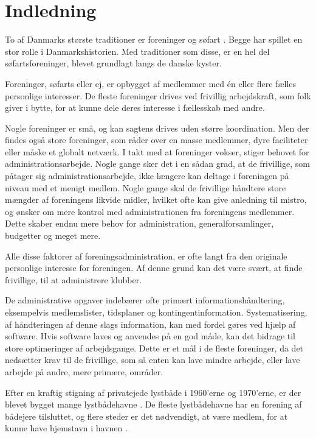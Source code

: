 \chapter{Indledning}
To af Danmarks største traditioner er foreninger og søfart \cite{forening2010,moller1997}. Begge har spillet en stor rolle i Danmarkshistorien. Med traditioner som disse, er en hel del søfartsforeninger, blevet grundlagt langs de danske kyster. 

Foreninger, søfarts eller ej, er opbygget af medlemmer med én eller flere fælles personlige interesser. De fleste foreninger drives ved frivillig arbejdskraft, som folk giver i bytte, for at kunne dele deres interesse i fællesskab med andre. 

Nogle foreninger er små, og kan sagtens drives uden større koordination. Men der findes også store foreninger, som råder over en masse medlemmer, dyre faciliteter eller måske et globalt netværk. I takt med at foreninger vokser, stiger behovet for administrationsarbejde. Nogle gange sker det i en sådan grad, at de frivillige, som påtager sig administrationsarbejde, ikke længere kan deltage i foreningen på niveau med et menigt medlem. Nogle gange skal de frivillige håndtere store mængder af foreningens likvide midler, hvilket ofte kan give anledning til mistro, og ønsker om mere kontrol med administrationen fra foreningens medlemmer. Dette skaber endnu mere behov for administration, generalforsamlinger, budgetter og meget mere.

Alle disse faktorer af foreningsadministration, er ofte langt fra den originale personlige interesse for foreningen. Af denne grund kan det være svært, at finde frivillige, til at administrere klubber.

De administrative opgaver indebærer ofte primært informationshåndtering, eksempelvis medlemslister, tidsplaner og kontingentinformation. Systematisering, af håndteringen af denne slags information, kan med fordel gøres ved hjælp af software. Hvis software laves og anvendes på en god måde, kan det bidrage til store optimeringer af arbejdsgange. Dette er et mål i de fleste foreninger, da det nedsætter krav til de frivillige, som så enten kan lave mindre arbejde, eller lave arbejde på andre, mere primære, områder.

Efter en kraftig stigning af privatejede lystbåde i 1960'erne og 1970'erne, er der blevet bygget mange lystbådehavne \cite{gyldendal_redaktionen_havn_2013}. De fleste lystbådehavne har en forening af bådejere tilsluttet, og flere steder er det nødvendigt, at være medlem, for at kunne have hjemstavn i havnen \cite{int_vb_sl}.

